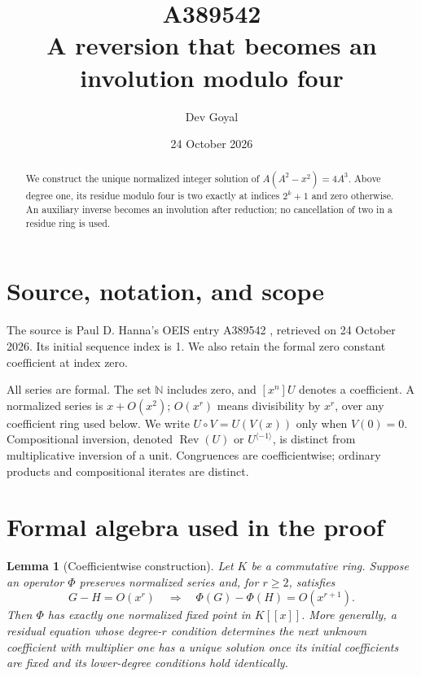 \documentclass[11pt,a4paper]{article}
\title{A389542\\[4pt]\large A reversion that becomes an involution modulo four}
\author{Dev Goyal}
\date{24 October 2026}
\newtheorem{lemma}[theorem]{Lemma}
\theoremstyle{remark}
\newcommand{\N}{\mathbb N}
\newcommand{\ps}[1]{#1[[x]]}
\newcommand{\Rev}{\operatorname{Rev}}
\newcommand{\rev}{^{\langle-1\rangle}}
\begin{document}
\maketitle
\begin{center}
\end{center}
\begin{abstract}
We construct the unique normalized integer solution of $A(A^2-x^2)=4A^3$. Above degree one, its residue modulo four is two exactly at indices $2^k+1$ and zero otherwise. An auxiliary inverse becomes an involution after reduction; no cancellation of two in a residue ring is used.
\end{abstract}

\section{Source, notation, and scope}

The source is Paul D. Hanna's OEIS entry A389542 \cite{oeis542},
retrieved on 24 October 2026. Its initial sequence index is 1.
We also retain the formal zero constant coefficient at index zero.

All series are formal. The set $\N$ includes zero, and $[x^n]U$ denotes a
coefficient. A normalized series is $x+O(x^2)$; $O(x^r)$ means divisibility
by $x^r$, over any coefficient ring used below. We write $U\circ V=U(V(x))$
only when $V(0)=0$. Compositional inversion, denoted $\Rev(U)$ or $U\rev$,
is distinct from multiplicative inversion of a unit. Congruences are
coefficientwise; ordinary products and compositional iterates are distinct.

\section{Formal algebra used in the proof}

\begin{lemma}[Coefficientwise construction]\label{lem:contraction}
Let $K$ be a commutative ring. Suppose an operator $\Phi$ preserves
normalized series and, for $r\ge2$, satisfies
\[
 G-H=O(x^r)\quad\Longrightarrow\quad
 \Phi(G)-\Phi(H)=O(x^{r+1}).
\]
Then $\Phi$ has exactly one normalized fixed point in $\ps K$.
More generally, a residual equation whose degree-$r$ condition determines
the next unknown coefficient with multiplier one has a unique solution
once its initial coefficients are fixed and its lower-degree conditions
hold identically.
\end{lemma}
\end{document}
